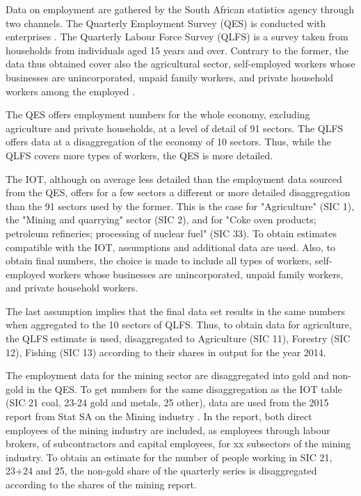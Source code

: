 \documentclass[12pt,english]{article}
\newcommand\lies[2][]{\todo[color=orange!50,#1]{ldf: #2}}
\begin{document}
Data on employment are gathered by the South African statistics agency through two channels. The Quarterly Employment Survey (QES) is conducted with enterprises \citep{QES2018}. The Quarterly Labour Force Survey (QLFS) is a survey taken from households from individuals aged 15 years and over. Contrary to the former, the data thus obtained cover also the agricultural sector, self-employed workers whose businesses are unincorporated, unpaid family workers, and private household workers among the employed \citep{QLFS2018}.

The QES offers employment numbers for the whole economy, excluding agriculture and private households, at a level of detail of 91 sectors. The QLFS offers data at a disaggregation of the economy of 10 sectors. Thus, while the QLFS covers more types of workers, the QES is more detailed.

The IOT, although on average less detailed than the employment data sourced from the QES, offers for a few sectors a different or more detailed disaggregation than the 91 sectors used by the former. This is the case for "Agriculture" (SIC 1), the "Mining and quarrying" sector (SIC 2), and for "Coke oven products; petroleum refineries; processing of nuclear fuel" (SIC 33). To obtain estimates compatible with the IOT, assumptions and additional data are used. Also, to obtain final numbers, the choice is made to include all types of workers, self-employed workers whose businesses are unincorporated, unpaid family workers, and private household workers.
 
The last assumption implies that the final data set results in the same numbers when aggregated to the 10 sectors of QLFS. Thus, to obtain data for agriculture, the QLFS estimate is used, disaggregated to Agriculture (SIC 11), Forestry (SIC 12), Fishing (SIC 13) according to their shares in output for the year 2014. 

The employment data for the mining sector are disaggregated into gold and non-gold in the QES. To get numbers for the same disaggregation as the IOT table (SIC 21 coal, 23-24 gold and metals, 25 other), data are used from the 2015 report from Stat SA on the Mining industry \citep{mining2015}. In the report, both direct employees of the mining industry are included, as employees through labour brokers, of subcontractors and capital employees\lies{what are those?}, for xx subsectors of the mining industry. %
To obtain an estimate for the number of people working in SIC 21, 23+24 and 25, the non-gold share of the quarterly series is disaggregated according to the shares of the mining report. 
\end{document}
